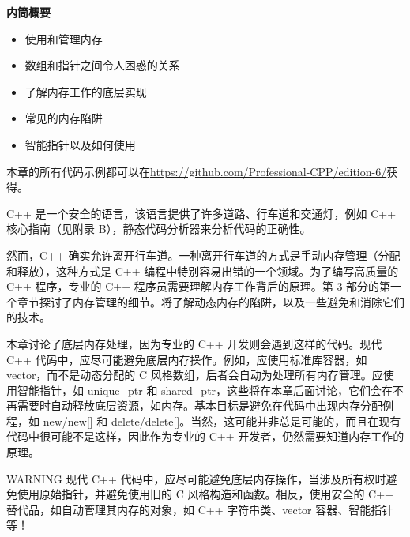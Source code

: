 \noindent
\textbf{内筒概要}

\begin{itemize}
\item
使用和管理内存

\item
数组和指针之间令人困惑的关系

\item
了解内存工作的底层实现

\item
常见的内存陷阱

\item
智能指针以及如何使用
\end{itemize}

本章的所有代码示例都可以在\url{https://github.com/Professional-CPP/edition-6/}获得。

C++ 是一个安全的语言，该语言提供了许多道路、行车道和交通灯，例如 C++ 核心指南（见附录 B），静态代码分析器来分析代码的正确性。

然而，C++ 确实允许离开行车道。一种离开行车道的方式是手动内存管理（分配和释放），这种方式是 C++ 编程中特别容易出错的一个领域。为了编写高质量的 C++ 程序，专业的 C++ 程序员需要理解内存工作背后的原理。第 3 部分的第一个章节探讨了内存管理的细节。将了解动态内存的陷阱，以及一些避免和消除它们的技术。

本章讨论了底层内存处理，因为专业的 C++ 开发则会遇到这样的代码。现代 C++ 代码中，应尽可能避免底层内存操作。例如，应使用标准库容器，如 vector，而不是动态分配的 C 风格数组，后者会自动为处理所有内存管理。应使用智能指针，如 unique\_ptr 和 shared\_ptr，这些将在本章后面讨论，它们会在不再需要时自动释放底层资源，如内存。基本目标是避免在代码中出现内存分配例程，如 new/new[] 和 delete/delete[]。当然，这可能并非总是可能的，而且在现有代码中很可能不是这样，因此作为专业的 C++ 开发者，仍然需要知道内存工作的原理。

\begin{myWarning}{WARNING}
现代 C++ 代码中，应尽可能避免底层内存操作，当涉及所有权时避免使用原始指针，并避免使用旧的 C 风格构造和函数。相反，使用安全的 C++ 替代品，如自动管理其内存的对象，如 C++ 字符串类、vector 容器、智能指针等！
\end{myWarning}




